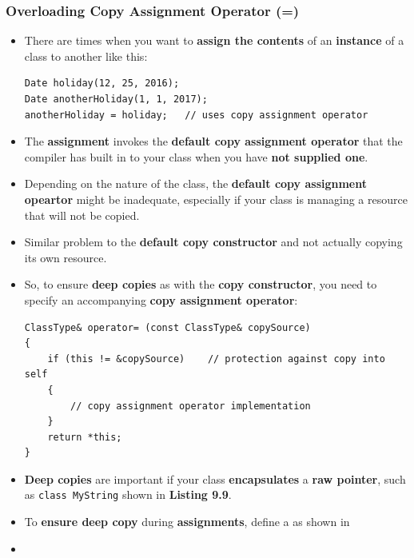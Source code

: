 \documentclass[10pt]{article}
\begin{document}
\newpage

\subsubsection{Overloading Copy Assignment Operator (=)}
\begin{itemize}
	\item There are times when you want to \textbf{assign the contents} of an \textbf{instance} of a class to another like this:
		\begin{verbatim}
Date holiday(12, 25, 2016);
Date anotherHoliday(1, 1, 2017);
anotherHoliday = holiday;	// uses copy assignment operator
		\end{verbatim}

	\item The \textbf{assignment} invokes the \textbf{default copy assignment operator} that the compiler has built in to your class when you have \textbf{not supplied one}.

	\item Depending on the nature of the class, the \textbf{default copy assignment opeartor} might be inadequate, especially if your class is managing a resource that will not be copied.

	\item Similar problem to the \textbf{default copy constructor} and not actually copying its own resource.

	\item So, to ensure \textbf{deep copies} as with the \textbf{copy constructor}, you need to specify an accompanying \textbf{copy assignment operator}:

\begin{verbatim}
ClassType& operator= (const ClassType& copySource)
{
	if (this != &copySource)	// protection against copy into self
	{
		// copy assignment operator implementation
	}
	return *this;
}
\end{verbatim}

\item \textbf{Deep copies} are important if your class \textbf{encapsulates} a \textbf{raw pointer}, such as \verb|class MyString| shown in \textbf{Listing 9.9}.

\item To \textbf{ensure deep copy} during \textbf{assignments}, define a \textbf{} as shown in \textbf{} 

\item {}


\end{itemize}
\end{document}
